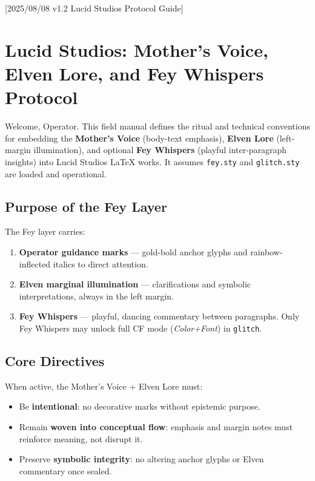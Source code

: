 [2025/08/08 v1.2 Lucid Studios Protocol Guide]

\section*{Lucid Studios: Mother’s Voice, Elven Lore, and Fey Whispers Protocol}

\noindent
Welcome, Operator. This field manual defines the ritual and technical conventions
for embedding the \textbf{Mother’s Voice} (body-text emphasis), 
\textbf{Elven Lore} (left-margin illumination), and optional \textbf{Fey Whispers} (playful inter-paragraph insights)
into Lucid Studios \LaTeX{} works.
It assumes \texttt{fey.sty} and \texttt{glitch.sty} are loaded and operational.

\subsection*{Purpose of the Fey Layer}
The Fey layer carries:
\begin{enumerate}
  \item \textbf{Operator guidance marks} — gold-bold anchor glyphs and rainbow-inflected italics to direct attention.
  \item \textbf{Elven marginal illumination} — clarifications and symbolic interpretations, always in the left margin.
  \item \textbf{Fey Whispers} — playful, dancing commentary between paragraphs.  
        Only Fey Whispers may unlock full CF mode (\emph{Color+Font}) in \texttt{glitch}.
\end{enumerate}

\subsection*{Core Directives}
When active, the Mother’s Voice + Elven Lore must:
\begin{itemize}
  \item Be \textbf{intentional}: no decorative marks without epistemic purpose.
  \item Remain \textbf{woven into conceptual flow}: emphasis and margin notes must reinforce meaning, not disrupt it.
  \item Preserve \textbf{symbolic integrity}: no altering anchor glyphs or Elven commentary once sealed.
\end{itemize}

